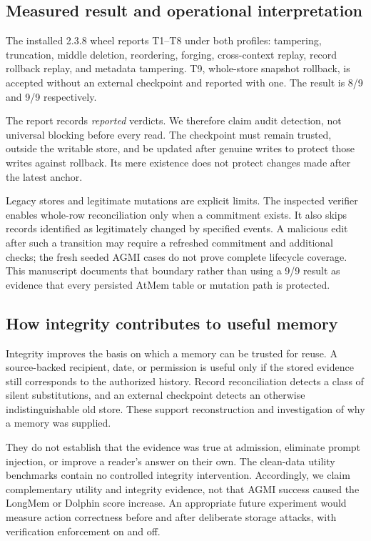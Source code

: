 \documentclass[11pt]{article}
\begin{document}
\subsection{Measured result and operational interpretation}
The installed 2.3.8 wheel reports T1--T8 under both profiles: tampering, truncation, middle deletion, reordering, forging, cross-context replay, record rollback replay, and metadata tampering. T9, whole-store snapshot rollback, is accepted without an external checkpoint and reported with one. The result is 8/9 and 9/9 respectively.

The report records \emph{reported} verdicts. We therefore claim audit detection, not universal blocking before every read. The checkpoint must remain trusted, outside the writable store, and be updated after genuine writes to protect those writes against rollback. Its mere existence does not protect changes made after the latest anchor.

Legacy stores and legitimate mutations are explicit limits. The inspected verifier enables whole-row reconciliation only when a commitment exists. It also skips records identified as legitimately changed by specified events. A malicious edit after such a transition may require a refreshed commitment and additional checks; the fresh seeded AGMI cases do not prove complete lifecycle coverage. This manuscript documents that boundary rather than using a 9/9 result as evidence that every persisted AtMem table or mutation path is protected.

\subsection{How integrity contributes to useful memory}
Integrity improves the basis on which a memory can be trusted for reuse. A source-backed recipient, date, or permission is useful only if the stored evidence still corresponds to the authorized history. Record reconciliation detects a class of silent substitutions, and an external checkpoint detects an otherwise indistinguishable old store. These support reconstruction and investigation of why a memory was supplied.

They do not establish that the evidence was true at admission, eliminate prompt injection, or improve a reader's answer on their own. The clean-data utility benchmarks contain no controlled integrity intervention. Accordingly, we claim complementary utility and integrity evidence, not that AGMI success caused the LongMem or Dolphin score increase. An appropriate future experiment would measure action correctness before and after deliberate storage attacks, with verification enforcement on and off.
\end{document}
